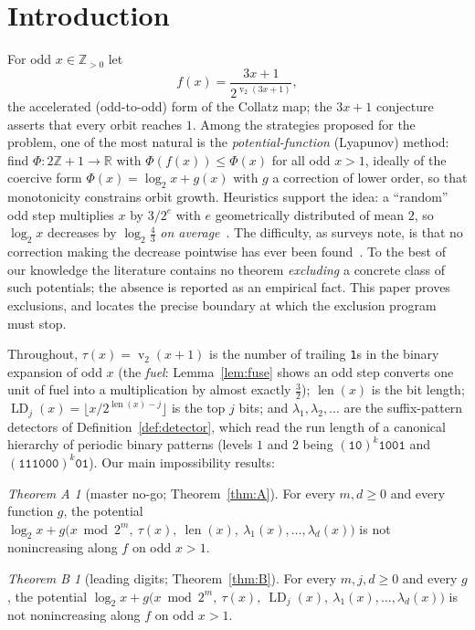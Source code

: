\documentclass[11pt]{article}
\theoremstyle{definition}
\theoremstyle{remark}
\newtheorem*{thmA}{Theorem A}
\newtheorem*{thmB}{Theorem B}
\newcommand{\Z}{\mathbb{Z}}
\newcommand{\R}{\mathbb{R}}
\newcommand{\bitlen}{\operatorname{len}}
\newcommand{\LD}{\operatorname{LD}}
\DeclareMathOperator{\vv}{v}
\begin{document}
\section{Introduction}

For odd $x\in\Z_{>0}$ let
\[
f(x)=\frac{3x+1}{2^{\vv_2(3x+1)}},
\]
the accelerated (odd-to-odd) form of the Collatz map; the $3x+1$
conjecture asserts that every orbit reaches $1$. Among the strategies
proposed for the problem, one of the most natural is the
\emph{potential-function} (Lyapunov) method: find
$\Phi:2\Z+1\to\R$ with $\Phi(f(x))\le\Phi(x)$ for all odd $x>1$,
ideally of the coercive form $\Phi(x)=\log_2x+g(x)$ with $g$ a
correction of lower order, so that monotonicity constrains orbit
growth. Heuristics support the idea: a ``random'' odd step multiplies
$x$ by $3/2^{e}$ with $e$ geometrically distributed of mean $2$, so
$\log_2x$ decreases by $\log_2\frac43$ \emph{on
average}~\cite{Lagarias1985}. The difficulty, as surveys note, is that
no correction making the decrease pointwise has ever been
found~\cite{Lagarias2010}. To the best of our knowledge the literature
contains no theorem \emph{excluding} a concrete class of such
potentials; the absence is reported as an empirical fact. This paper
proves exclusions, and locates the precise boundary at which the
exclusion program must stop.

Throughout, $\tau(x)=\vv_2(x+1)$ is the number of trailing
\texttt{1}s in the binary expansion of odd $x$ (the \emph{fuel}:
Lemma~\ref{lem:fuse} shows an odd step converts one unit of fuel into a
multiplication by almost exactly $\tfrac32$); $\bitlen(x)$ is the bit
length; $\LD_j(x)=\lfloor x/2^{\bitlen(x)-j}\rfloor$ is the top $j$
bits; and $\lambda_1,\lambda_2,\dots$ are the suffix-pattern detectors
of Definition~\ref{def:detector}, which read the run length of a
canonical hierarchy of periodic binary patterns (levels $1$ and $2$
being $(\texttt{10})^{k}\texttt{1001}$ and
$(\texttt{111000})^{k}\texttt{01}$). Our main impossibility results:

\begin{thmA}[master no-go; Theorem~\ref{thm:A}]
For every $m,d\ge0$ and every function $g$, the potential
$\log_2x+g\bigl(x\bmod2^m,\ \tau(x),\ \bitlen(x),\
\lambda_1(x),\dots,\lambda_d(x)\bigr)$ is not nonincreasing along $f$
on odd $x>1$.
\end{thmA}

\begin{thmB}[leading digits; Theorem~\ref{thm:B}]
For every $m,j,d\ge0$ and every $g$, the potential
$\log_2x+g\bigl(x\bmod2^m,\ \tau(x),\ \LD_j(x),\
\lambda_1(x),\dots,\lambda_d(x)\bigr)$ is not nonincreasing along $f$
on odd $x>1$.
\end{thmB}
\end{document}
